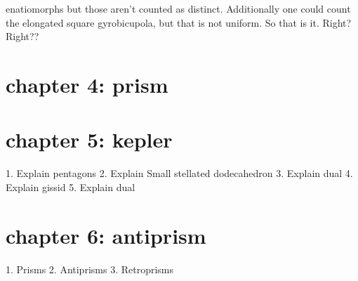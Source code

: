 \documentclass{article}
\begin{document}
enatiomorphs but those aren't counted as distinct. Additionally one could count the elongated square gyrobicupola, but that is not uniform. So that is it. Right? Right??
\section*{chapter 4: prism}

\section*{chapter 5: kepler}
1. Explain pentagons
2. Explain Small stellated dodecahedron
3. Explain dual
4. Explain gissid
5. Explain dual
 \section*{chapter 6: antiprism}
1. Prisms
2. Antiprisms
3. Retroprisms
\end{document}
